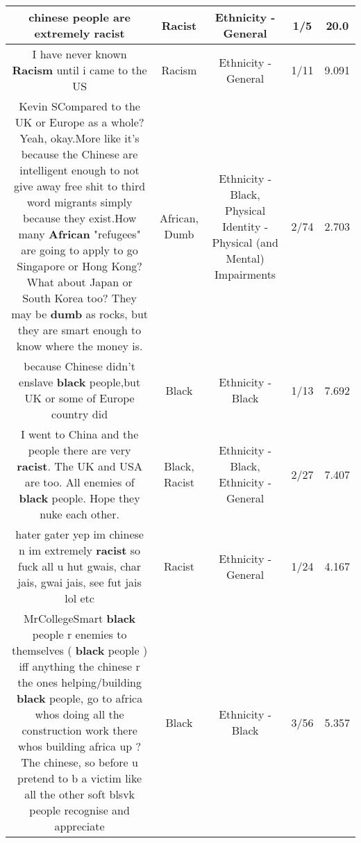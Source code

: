 \documentclass[11pt]{article}
\newlength\mylength
\begin{document}
\begin{center}
\begin{longtable}{|C{.65\mylength}|C{.30\mylength}|C{.12\mylength}|C{.12\mylength}|C{.12\mylength}|}
  \small chinese people are extremely racist\normalsize   & Racist & Ethnicity - General & 1/5 & 20.0 \\  \hline
  \small I have never known \textbf{Racism} until i came to the US\normalsize   & Racism & Ethnicity - General & 1/11 & 9.091 \\  \hline
  \small Kevin SCompared to the UK or Europe as a whole? Yeah, okay.More like it's because the Chinese are intelligent enough to not give away free shit to third word migrants simply because they exist.How many \textbf{African} "refugees" are going to apply to go Singapore or Hong Kong? What about Japan or South Korea too? They may be \textbf{dumb} as rocks, but they are smart enough to know where the money is.\normalsize   & African, Dumb & Ethnicity - Black, Physical Identity - Physical (and Mental) Impairments & 2/74 & 2.703 \\  \hline
  \small because Chinese didn't enslave \textbf{black} people,but UK or some of Europe country did\normalsize   & Black & Ethnicity - Black & 1/13 & 7.692 \\  \hline
  \small I went to China and the people there are very \textbf{racist}. The UK and USA are too. All enemies of \textbf{black} people. Hope they nuke each other.\normalsize   & Black, Racist & Ethnicity - Black, Ethnicity - General & 2/27 & 7.407 \\  \hline
  \small hater gater yep im chinese n im extremely \textbf{racist} so fuck all u hut gwais, char jais, gwai jais, see fut jais lol etc\normalsize   & Racist & Ethnicity - General & 1/24 & 4.167 \\  \hline
  \small MrCollegeSmart \textbf{black} people r enemies to themselves ( \textbf{black} people ) iff anything the chinese r the ones helping/building \textbf{black} people, go to africa whos doing all the construction work there whos building africa up ? The chinese, so before u pretend to b a victim like all the other soft blsvk people recognise and appreciate\normalsize   & Black & Ethnicity - Black & 3/56 & 5.357 \\  \hline

\end{longtable}
\end{center}
\end{document}

